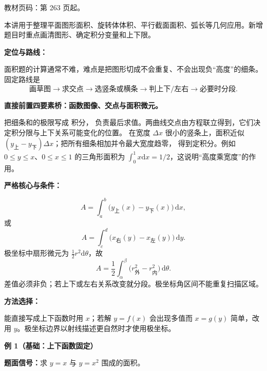 
\begin{knowledgeBox}
教材页码：第 263 页起。

本讲用于整理平面图形面积、旋转体体积、平行截面面积、弧长等几何应用。新增题目时重点画清图形、确定积分变量和上下限。
\end{knowledgeBox}


\par

\begin{knowledgeBox}
\textbf{定位与路线：}

面积题的计算通常不难，难点是把图形切成不会重复、不会出现负“高度”的细条。
固定路线是
\[
\boxed{\text{画草图}\to\text{求交点}\to\text{选竖条或横条}
\to\text{判上下/左右}\to\text{必要时分段}.}
\]

\textbf{直接前置四要素桥：函数图像、交点与面积微元。}

把细条和的极限写成
积分，
负责最后求值。两曲线交点由方程联立得到，它们决定积分限与上下关系可能变化的位置。
在宽度 \(\Delta x\) 很小的竖条上，面积近似
\((y_{\text{上}}-y_{\text{下}})\Delta x\)；把所有细条相加并令最大宽度趋零，
得到定积分。例如 \(0\le y\le x\)、\(0\le x\le1\) 的三角形面积为
\(\int_0^1x\mathrm dx=1/2\)，这说明“高度乘宽度”的作用。

\textbf{严格核心与条件：}

\[
A=\int_a^b\bigl(y_{\text{上}}(x)-y_{\text{下}}(x)\bigr)\,\mathrm dx,
\]
或
\[
A=\int_c^d\bigl(x_{\text{右}}(y)-x_{\text{左}}(y)\bigr)\,\mathrm dy.
\]
极坐标中扇形微元为 \(\frac12r^2\mathrm d\theta\)，故
\[
A=\frac12\int_\alpha^\beta
\bigl(r_{\text{外}}^2-r_{\text{内}}^2\bigr)\,\mathrm d\theta.
\]
差值必须非负；若上下或左右关系改变就分段。极坐标角区间不能重复扫描区域。

\textbf{方法选择：}

能直接写成上下函数时用 \(x\)；若解 \(y=f(x)\) 会出现多值而
\(x=g(y)\) 简单，改用 \(y\)。极坐标边界以射线描述更自然时才使用极坐标。

\textbf{例 1（基础：上下函数固定）}

\textbf{题面信号：}求 \(y=x\) 与 \(y=x^2\) 围成的面积。


\end{knowledgeBox}
